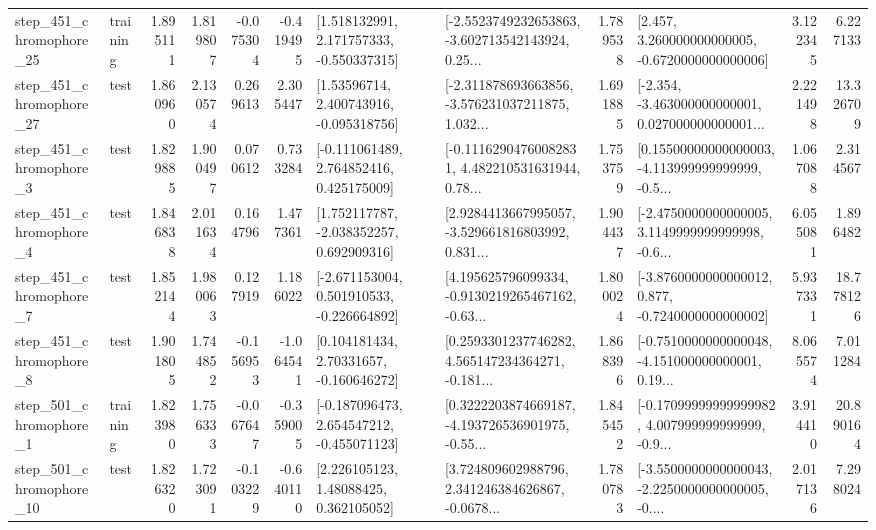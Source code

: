 \begin{tabular}{llrrrrllrlrr}
  step\_451\_chromophore\_25 &  training &      1.895111 &    1.819807 &     -0.075304 & -0.419495 &    [1.518132991, 2.171757333, -0.550337315] &  [-2.5523749232653863, -3.602713542143924, 0.25... &       1.789538 &    [2.457, 3.260000000000005, -0.6720000000000006] &            3.122345 &          6.227133 \\
  step\_451\_chromophore\_27 &      test &      1.860960 &    2.130574 &      0.269613 &  2.305447 &     [1.53596714, 2.400743916, -0.095318756] &  [-2.311878693663856, -3.576231037211875, 1.032... &       1.691885 &  [-2.354, -3.463000000000001, 0.027000000000001... &            2.221498 &         13.326709 \\
   step\_451\_chromophore\_3 &      test &      1.829885 &    1.900497 &      0.070612 &  0.733284 &    [-0.111061489, 2.764852416, 0.425175009] &  [-0.11162904760082831, 4.482210531631944, 0.78... &       1.753759 &  [0.15500000000000003, -4.113999999999999, -0.5... &            1.067088 &          2.314567 \\
   step\_451\_chromophore\_4 &      test &      1.846838 &    2.011634 &      0.164796 &  1.477361 &    [1.752117787, -2.038352257, 0.692909316] &  [2.9284413667995057, -3.529661816803992, 0.831... &       1.904437 &  [-2.4750000000000005, 3.1149999999999998, -0.6... &            6.055081 &          1.896482 \\
   step\_451\_chromophore\_7 &      test &      1.852144 &    1.980063 &      0.127919 &  1.186022 &   [-2.671153004, 0.501910533, -0.226664892] &  [4.195625796099334, -0.9130219265467162, -0.63... &       1.800024 &  [-3.8760000000000012, 0.877, -0.7240000000000002] &            5.937331 &         18.778126 \\
   step\_451\_chromophore\_8 &      test &      1.901805 &    1.744852 &     -0.156953 & -1.064541 &     [0.104181434, 2.70331657, -0.160646272] &  [0.2593301237746282, 4.565147234364271, -0.181... &       1.868396 &  [-0.7510000000000048, -4.151000000000001, 0.19... &            8.065574 &          7.011284 \\
   step\_501\_chromophore\_1 &  training &      1.823980 &    1.756333 &     -0.067647 & -0.359005 &   [-0.187096473, 2.654547212, -0.455071123] &  [0.3222203874669187, -4.193726536901975, -0.55... &       1.845452 &  [-0.17099999999999982, 4.007999999999999, -0.9... &            3.914410 &         20.890164 \\
  step\_501\_chromophore\_10 &      test &      1.826320 &    1.723091 &     -0.103229 & -0.640110 &      [2.226105123, 1.48088425, 0.362105052] &  [3.724809602988796, 2.341246384626867, -0.0678... &       1.780783 &  [-3.5500000000000043, -2.2250000000000005, -0.... &            2.017136 &          7.298024 \\

\end{tabular}
